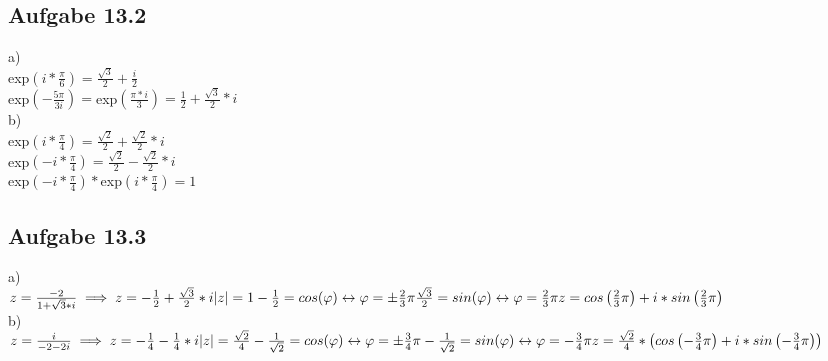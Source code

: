 \documentclass{standalone}
\begin{document}
\subsection{Aufgabe 13.2}

a)\\
exp$\left(i*\frac{\pi}{6}\right)=\frac{\sqrt{3}}{2}+\frac{i}{2}$\\ 
exp$\left(-\frac{5\pi}{3i}\right)=$exp$\left(\frac{\pi*i}{3}\right)=\frac{1}{2}+\frac{\sqrt{3}}{2}*i$\\

\noindent b)\\
exp$\left(i*\frac{\pi}{4}\right)=\frac{\sqrt{2}}{2}+\frac{\sqrt{2}}{2}*i$\\
exp$\left(-i*\frac{\pi}{4}\right)=\frac{\sqrt{2}}{2}-\frac{\sqrt{2}}{2}*i$\\
exp$\left(-i*\frac{\pi}{4}\right)*$exp$\left(i*\frac{\pi}{4}\right)=1$\\


\subsection{Aufgabe 13.3}

a)\\
$z=\frac{-2}{1+\sqrt{3}*i} \implies z=-\frac{1}{2}+\frac{\sqrt{3}}{2}*i\\
\lvert z\rvert=1\\
-\frac{1}{2}=cos(\varphi) \leftrightarrow \varphi = \pm \frac{2}{3}\pi\\
\frac{\sqrt{3}}{2}=sin(\varphi) \leftrightarrow \varphi = \frac{2}{3}\pi\\
z=cos\left(\frac{2}{3}\pi \right) + i * sin\left(\frac{2}{3}\pi \right)$\\


\noindent b)\\ 
$z= \frac{i}{-2-2i} \implies z=-\frac{1}{4}-\frac{1}{4}*i\\
\lvert z\rvert=\frac{\sqrt{2}}{4}\\
-\frac{1}{\sqrt{2}}=cos(\varphi) \leftrightarrow \varphi = \pm \frac{3}{4}\pi\\
-\frac{1}{\sqrt{2}}=sin(\varphi) \leftrightarrow \varphi = -\frac{3}{4}\pi\\
z=\frac{\sqrt{2}}{4}*\left(cos\left(-\frac{3}{4}\pi \right)+ i * sin\left(-\frac{3}{4} \pi \right)\right)$
 
\end{document}
